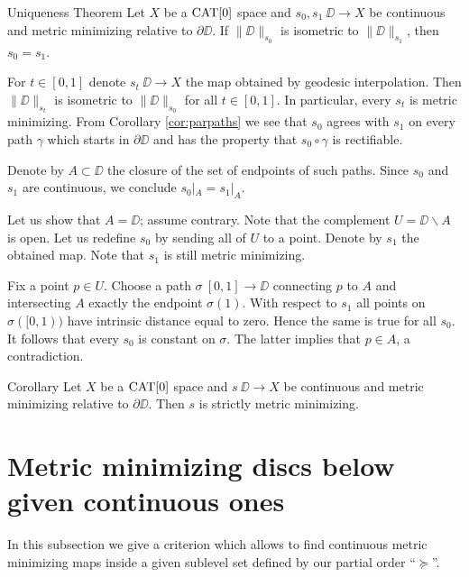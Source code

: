 \documentclass{article}
\begin{document}
\begin{thm}{Uniqueness Theorem}\label{prop:strict-mm}
Let $X$ be a $\mathop{\rm CAT}\nolimits[0]$ space and $s_0, s_1\:\DD\to X$ be continuous and metric minimizing relative to $\partial\DD$. 
If 
$\|\DD\|_{s_0}$ is isometric to $\|\DD\|_{s_1}$, then $s_0=s_1$.
\end{thm}

For $t\in[0,1]$ denote $s_t\:\DD\to X$ the map obtained by geodesic interpolation. 
Then
$\|\DD\|_{s_t}$ is isometric to $\|\DD\|_{s_0}$ for all $t\in[0,1]$. 
In particular, every $s_t$ is metric minimizing.
From Corollary \ref{cor:parpaths} we see that $s_0$ agrees with $s_1$ on every path $\gamma$ which starts
in $\partial\DD$ and has the property that $s_0\circ\gamma$ is rectifiable. 

Denote by $A\subset\DD$ the closure of the set of endpoints of such paths. 
Since $s_0$ and $s_1$ are continuous, we conclude $s_0|_{A}=s_1|_{A}$.

Let us show that $A=\DD$; assume contrary.
Note that the complement $U=\DD\backslash A$ is open. 
Let us redefine $s_0$ by sending all of $U$ to a point.
Denote by $s_1$ the obtained map.
Note that $s_1$
is still metric minimizing.

Fix a point $p\in U$.
Choose a path $\sigma\:[0,1]\to\DD$ connecting $p$ to $A$ and intersecting $A$ exactly the endpoint $\sigma(1)$. 
With respect to $s_1$ all points on $\sigma([0,1))$ have intrinsic distance equal to zero.  
Hence the same is true for all $s_0$. 
It follows that every $s_0$ is constant on $\sigma$.
The latter implies that $p\in A$, a contradiction.
\qeds



\begin{thm}{Corollary}\label{cor:strict-mm}
Let  $X$ be a $\mathop{\rm CAT}\nolimits[0]$ space and $s\:\DD\to X$ be continuous and metric minimizing relative to $\partial\DD$. 
Then $s$ is strictly metric minimizing.
\end{thm}



\section{Metric minimizing discs below given continuous ones}
In this subsection we give a criterion which allows to 
find continuous metric minimizing maps inside a given sublevel set defined by our partial order ``$\succcurlyeq$''.
\end{document}
